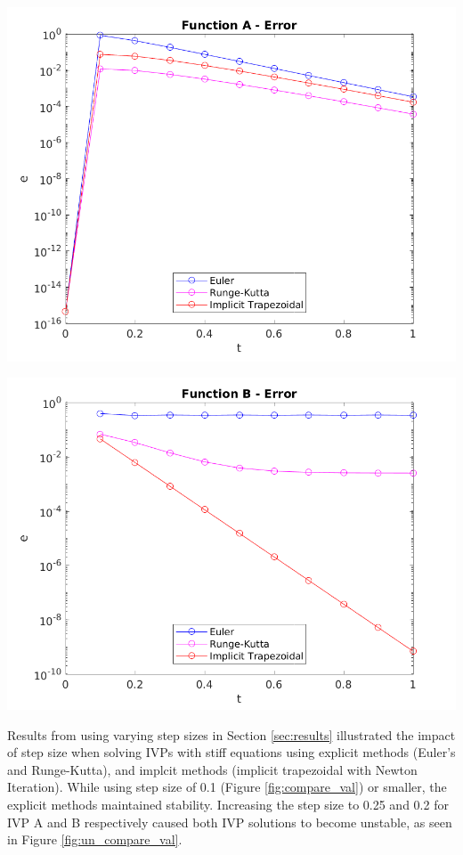 \documentclass{article}
\begin{document}
\begin{center}
	\centering
    \begin{minipage}{0.5\textwidth}
        \centering
	    \includegraphics[width=1\textwidth]{../output/a_compare_err.png}
    \end{minipage}\hfill
    \begin{minipage}{0.5\textwidth}
        \centering
	    \includegraphics[width=1\textwidth]{../output/b_compare_err.png}
    \end{minipage}
 	\label{fig:compare_err}
\end{center}

Results from using varying step sizes in Section \ref{sec:results} illustrated the impact of step size when solving IVPs with stiff equations using explicit methods (Euler's and Runge-Kutta), and implcit methods (implicit trapezoidal with Newton Iteration). While using step size of 0.1 (Figure \ref{fig:compare_val}) or smaller, the explicit methods maintained stability. Increasing the step size to 0.25 and 0.2 for IVP A and B respectively caused both IVP solutions to become unstable, as seen in Figure \ref{fig:un_compare_val}.
\end{document}
